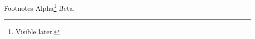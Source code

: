 \documentclass[aspectratio=169]{beamer}
\begin{document}
\begin{frame}{Footnotes}
Alpha\footnote<2>{Visible later.} Beta.
\end{frame}
\end{document}
